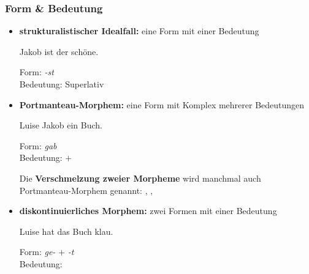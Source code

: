 \begin{frame}
\frametitle{Form \& Bedeutung}

\begin{itemize}
	\item \textbf{strukturalistischer Idealfall:} eine Form mit einer Bedeutung
	
	\ea	Jakob ist der schöne.
	
	Form: \emph{-st} \\
	Bedeutung: Superlativ
	\z

\pause 
	
	\item \textbf{Portmanteau-Morphem:}  eine Form mit Komplex mehrerer Bedeutungen
	
	\ea Luise  Jakob ein Buch.
	
	Form: \emph{gab} \\
	Bedeutung:  $+$ 
	\z
	
	Die \textbf{Verschmelzung zweier Morpheme} wird manchmal auch Portmanteau-Morphem genannt: , , 

\pause 
	
	\item \textbf{diskontinuierliches Morphem:} zwei Formen mit einer Bedeutung 
	
	\ea Luise hat das Buch klau.
	
	Form: \emph{ge-} $+$ \emph{-t} \\
	Bedeutung:  \\

	\z	

\end{itemize}

\end{frame}


